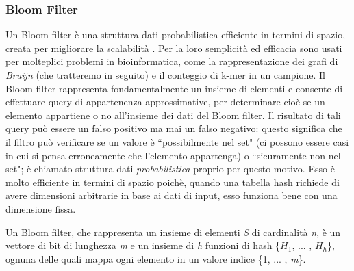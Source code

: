 \documentclass[../main.tex]{subfiles}
\begin{document}
\subsubsection{Bloom Filter}
\label{BloomFilter}
Un Bloom filter è una struttura dati probabilistica efficiente in termini di spazio, creata per migliorare la scalabilità \cite{sun-medvedev2018vargeno}. Per la loro semplicità ed efficacia sono usati per molteplici problemi in bioinformatica, come la rappresentazione dei grafi di \textit{Bruijn} (che tratteremo in seguito) e il conteggio di k-mer in un campione. Il Bloom filter rappresenta fondamentalmente un insieme di elementi e consente di effettuare query di appartenenza approssimative, per determinare cioè se un elemento appartiene o no all'insieme dei dati del Bloom filter. Il risultato di tali query può essere un falso positivo ma mai un falso negativo: questo significa che il filtro può verificare se un valore è ``possibilmente nel set" (ci possono essere casi in cui si pensa erroneamente che l'elemento appartenga) o ``sicuramente non nel set"; è chiamato struttura dati \textit{probabilistica} proprio per questo motivo. Esso è molto efficiente in termini di spazio poichè, quando una tabella hash richiede di avere dimensioni arbitrarie in base ai dati di input, esso funziona bene con una dimensione fissa.


\theoremstyle{definition}
\begin{definition} 

Un Bloom filter, che rappresenta un insieme di elementi \textit{S} di cardinalità \textit{n}, è un vettore di bit di lunghezza \textit{m} e un insieme di \textit{h} funzioni di hash \{$H_{1}$, ... , $H_{h}$\}, ognuna delle quali mappa ogni elemento in un valore indice \{1, ... , \textit{m}\}. 

\end{definition}
\end{document}
